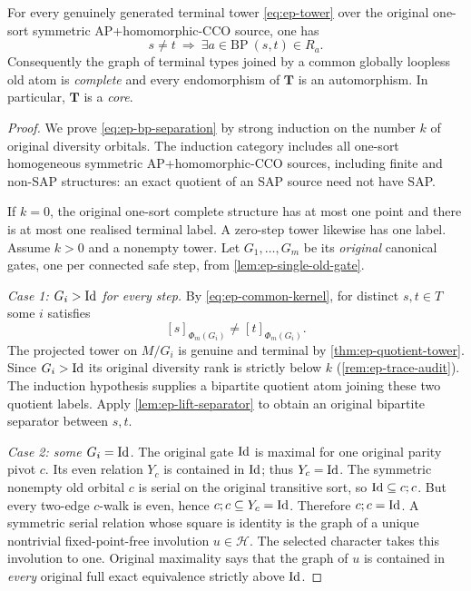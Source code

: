 \begin{theorem}
\label{thm:ep-automatic-core}
For every genuinely generated terminal tower
\eqref{eq:ep-tower} over the original one-sort
symmetric AP+homomorphic-CCO source, one has
\[
 \boxed{\quad s\ne t\ \Longrightarrow\
    \exists a\in\mathrm{BP}\ 
       (s,t)\in R_a .\quad}
 \tag{C2}\label{eq:ep-bp-separation}
\]
Consequently the graph of terminal types joined
by a common globally loopless old atom is
\emph{complete} and every endomorphism of
\(\mathbf T\) is an automorphism. In particular,
\(\mathbf T\) is a \emph{core}.
\end{theorem}
\begin{proof}
We prove \eqref{eq:ep-bp-separation} by strong
induction on the number \(k\) of original
diversity orbitals. The induction category includes
all one-sort homogeneous symmetric AP+homomorphic-CCO
sources, including finite and non-SAP structures:
an exact quotient of an SAP source need not have SAP.

If \(k=0\), the original one-sort complete structure
has at most one point and there is at most one realised
terminal label. A zero-step tower likewise has
one label. Assume \(k>0\) and a nonempty tower.
Let \(G_1,\ldots,G_m\) be its \emph{original}
canonical gates, one per connected safe step, from
\cref{lem:ep-single-old-gate}.

\emph{Case 1: \(G_i>\mathrm{Id}\) for every step.}
By \eqref{eq:ep-common-kernel}, for distinct
\(s,t\in T\) some \(i\) satisfies
\[
       [s]_{\Phi_m(G_i)}
            \ne [t]_{\Phi_m(G_i)} .
\]
The projected tower on \(M/G_i\) is genuine
and terminal by
\cref{thm:ep-quotient-tower}. Since \(G_i>\mathrm{Id}\)
its original diversity rank is strictly below \(k\)
(\cref{rem:ep-trace-audit}). The induction
hypothesis supplies a bipartite quotient
atom joining these two quotient labels.
Apply \cref{lem:ep-lift-separator} to obtain
an original bipartite separator between \(s,t\).

\emph{Case 2: some \(G_i=\mathrm{Id}\).}
The original gate \(\mathrm{Id}\) is maximal for one
original parity pivot \(c\). Its even relation
\(Y_c\) is contained in \(\mathrm{Id}\); thus
\(Y_c=\mathrm{Id}\). The symmetric nonempty
old orbital \(c\) is serial on the
original transitive sort, so
\(\mathrm{Id}\subseteq c;c\). But every
two-edge \(c\)-walk is even, hence
\(c;c\subseteq Y_c=\mathrm{Id}\). Therefore
\(c;c=\mathrm{Id}\). A symmetric serial
relation whose square is identity
is the graph of a unique nontrivial
fixed-point-free involution
\(u\in\mathscr H\). The selected
character takes this involution to one.
Original maximality says that the graph of \(u\)
is contained in \emph{every} original full
exact equivalence strictly above \(\mathrm{Id}\).


\end{proof}
